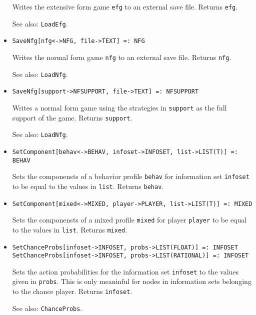 \begin{itemize}
\bd
Writes the extensive form game \verb+efg+ to an external
save file.  Returns \verb+efg+.
\item
[See also:] {\tt LoadEfg}.
\ed

\item
\protect \large \begin{verbatim}
SaveNfg[nfg<->NFG, file->TEXT] =: NFG
\end{verbatim}\normalsize

\bd
Writes the normal form game \verb+nfg+ to an external
save file.  Returns \verb+nfg+.
\item
[See also:] {\tt LoadNfg}.
\ed

\item
\protect \large \begin{verbatim}
SaveNfg[support->NFSUPPORT, file->TEXT] =: NFSUPPORT
\end{verbatim}\normalsize

\bd
Writes a normal form game using the strategies in \verb+support+ as the full support
of the game.  Returns \verb+support+.
\item
[See also:] {\tt LoadNfg}.
\ed

\item
\protect \large \begin{verbatim} 
SetComponent[behav<->BEHAV, infoset->INFOSET, list->LIST(T)] =: BEHAV 
\end{verbatim}\normalsize

\bd
Sets the componensts of a behavior profile \verb+behav+ for
information set \verb+infoset+ to be equal to the values in \verb+list+.
Returns \verb+behav+. 
\ed

\item
\protect \large \begin{verbatim} 
SetComponent[mixed<->MIXED, player->PLAYER, list->LIST(T)] =: MIXED 
\end{verbatim}\normalsize

\bd
Sets the componensts of a mixed profile \verb+mixed+ for player
\verb+player+ to be equal to the values in \verb+list+.
Returns \verb+mixed+. 
\ed

\item
\protect \large \begin{verbatim} 
SetChanceProbs[infoset->INFOSET, probs->LIST(FLOAT)] =: INFOSET
SetChanceProbs[infoset->INFOSET, probs->LIST(RATIONAL)] =: INFOSET
\end{verbatim}\normalsize

\bd
Sets the action probabilities for the information set
\verb+infoset+ to the values given in \verb+probs+.  This is only
meaninful for nodes in information sets belonging to the chance
player.  Returns \verb+infoset+. 
\item
[See also:] {\tt ChanceProbs}.
\ed



\end{itemize}
